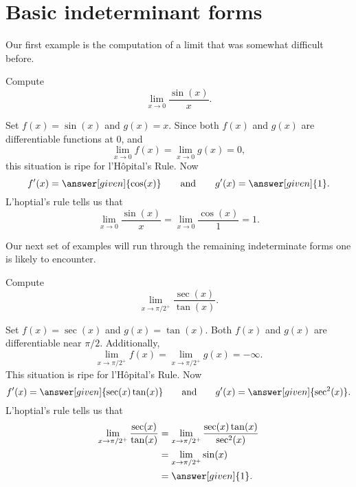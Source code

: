 \documentclass{ximera}
\begin{document}
\section{Basic indeterminant forms}


Our first example is the computation of a limit that was somewhat
difficult before.

\begin{example}
Compute
\[
\lim_{x\to 0} \frac{\sin(x)}{x}.
\]
\begin{explanation}
Set $f(x) = \sin(x)$ and $g(x) = x$.  Since both $f(x)$ and $g(x)$ are
differentiable functions at $0$, and 
\[
\lim_{x \to 0} f(x) = \lim_{x \to 0}g(x) = 0,
\]
this situation is ripe for l'H\^opital's Rule. Now
\[
f'(x) = \answer[given]{\cos(x)} \qquad\text{and}\qquad g'(x) = \answer[given]{1}.
\] 
L'hoptial's rule tells us that 
\[
\lim_{x \to 0} \frac{\sin(x)}{x} = \lim_{x \to 0} \frac{\cos(x)}{1} = 1.
\]
\end{explanation}
\end{example}


Our next set of examples will run through the remaining indeterminate
forms one is likely to encounter.

\begin{example}
  Compute 
\[
\lim_{x\to \pi/2^+} \frac{\sec(x)}{\tan(x)}.
\]
\begin{explanation}
Set $f(x) = \sec(x)$ and $g(x) = \tan(x)$. Both $f(x)$ and $g(x)$
are differentiable near $\pi/2$. Additionally,
\[
\lim_{x \to \pi/2^+} f(x) = \lim_{x \to \pi/2^+}g(x) = -\infty.
\]
This situation is ripe for l'H\^opital's Rule. Now 
\[
f'(x) = \answer[given]{\sec(x)\tan(x)} \qquad\text{and}\qquad g'(x) = \answer[given]{\sec^2(x)}.
\]
L'hoptial's rule tells us that 
\begin{align*}
\lim_{x\to \pi/2^+} \frac{\sec(x)}{\tan(x)} &= \lim_{x\to \pi/2^+}
\frac{\sec(x)\tan(x)}{\sec^2(x)} \\
&= \lim_{x\to \pi/2^+} \sin(x)\\
&=\answer[given]{1}.
\end{align*}
\end{explanation}
\end{example}
\end{document}
